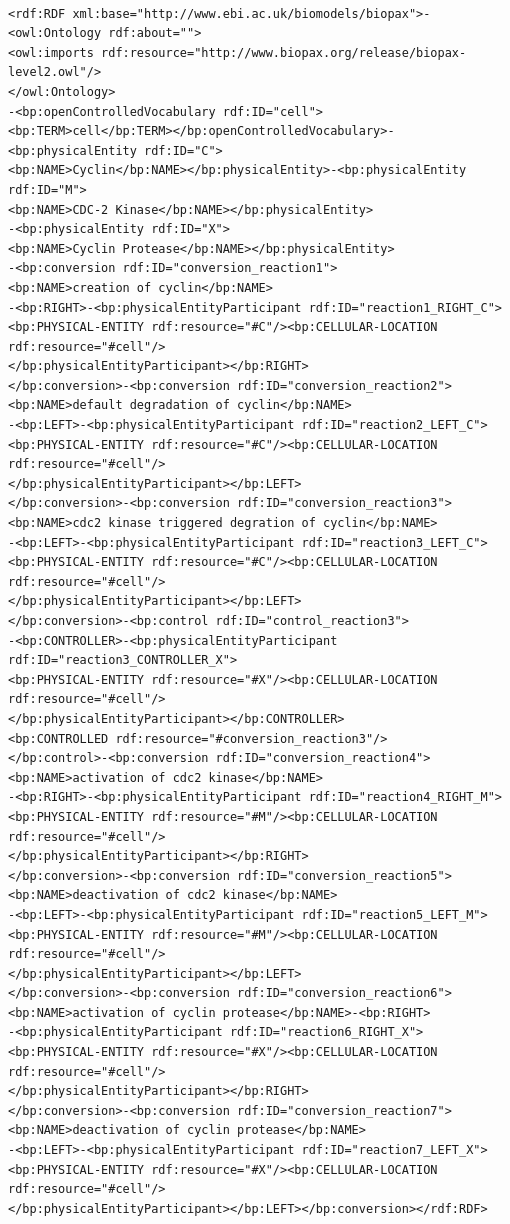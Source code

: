 \documentclass[a4paper,10pt,titlepage]{article}
\begin{document}
\scriptsize
\begin{verbatim}

<rdf:RDF xml:base="http://www.ebi.ac.uk/biomodels/biopax">-<owl:Ontology rdf:about="">
<owl:imports rdf:resource="http://www.biopax.org/release/biopax-level2.owl"/>
</owl:Ontology>
-<bp:openControlledVocabulary rdf:ID="cell">
<bp:TERM>cell</bp:TERM></bp:openControlledVocabulary>-<bp:physicalEntity rdf:ID="C">
<bp:NAME>Cyclin</bp:NAME></bp:physicalEntity>-<bp:physicalEntity rdf:ID="M">
<bp:NAME>CDC-2 Kinase</bp:NAME></bp:physicalEntity>
-<bp:physicalEntity rdf:ID="X">
<bp:NAME>Cyclin Protease</bp:NAME></bp:physicalEntity>
-<bp:conversion rdf:ID="conversion_reaction1">
<bp:NAME>creation of cyclin</bp:NAME>
-<bp:RIGHT>-<bp:physicalEntityParticipant rdf:ID="reaction1_RIGHT_C">
<bp:PHYSICAL-ENTITY rdf:resource="#C"/><bp:CELLULAR-LOCATION rdf:resource="#cell"/>
</bp:physicalEntityParticipant></bp:RIGHT>
</bp:conversion>-<bp:conversion rdf:ID="conversion_reaction2">
<bp:NAME>default degradation of cyclin</bp:NAME>
-<bp:LEFT>-<bp:physicalEntityParticipant rdf:ID="reaction2_LEFT_C">
<bp:PHYSICAL-ENTITY rdf:resource="#C"/><bp:CELLULAR-LOCATION rdf:resource="#cell"/>
</bp:physicalEntityParticipant></bp:LEFT>
</bp:conversion>-<bp:conversion rdf:ID="conversion_reaction3">
<bp:NAME>cdc2 kinase triggered degration of cyclin</bp:NAME>
-<bp:LEFT>-<bp:physicalEntityParticipant rdf:ID="reaction3_LEFT_C">
<bp:PHYSICAL-ENTITY rdf:resource="#C"/><bp:CELLULAR-LOCATION rdf:resource="#cell"/>
</bp:physicalEntityParticipant></bp:LEFT>
</bp:conversion>-<bp:control rdf:ID="control_reaction3">
-<bp:CONTROLLER>-<bp:physicalEntityParticipant rdf:ID="reaction3_CONTROLLER_X">
<bp:PHYSICAL-ENTITY rdf:resource="#X"/><bp:CELLULAR-LOCATION rdf:resource="#cell"/>
</bp:physicalEntityParticipant></bp:CONTROLLER>
<bp:CONTROLLED rdf:resource="#conversion_reaction3"/>
</bp:control>-<bp:conversion rdf:ID="conversion_reaction4">
<bp:NAME>activation of cdc2 kinase</bp:NAME>
-<bp:RIGHT>-<bp:physicalEntityParticipant rdf:ID="reaction4_RIGHT_M">
<bp:PHYSICAL-ENTITY rdf:resource="#M"/><bp:CELLULAR-LOCATION rdf:resource="#cell"/>
</bp:physicalEntityParticipant></bp:RIGHT>
</bp:conversion>-<bp:conversion rdf:ID="conversion_reaction5">
<bp:NAME>deactivation of cdc2 kinase</bp:NAME>
-<bp:LEFT>-<bp:physicalEntityParticipant rdf:ID="reaction5_LEFT_M">
<bp:PHYSICAL-ENTITY rdf:resource="#M"/><bp:CELLULAR-LOCATION rdf:resource="#cell"/>
</bp:physicalEntityParticipant></bp:LEFT>
</bp:conversion>-<bp:conversion rdf:ID="conversion_reaction6">
<bp:NAME>activation of cyclin protease</bp:NAME>-<bp:RIGHT>
-<bp:physicalEntityParticipant rdf:ID="reaction6_RIGHT_X">
<bp:PHYSICAL-ENTITY rdf:resource="#X"/><bp:CELLULAR-LOCATION rdf:resource="#cell"/>
</bp:physicalEntityParticipant></bp:RIGHT>
</bp:conversion>-<bp:conversion rdf:ID="conversion_reaction7">
<bp:NAME>deactivation of cyclin protease</bp:NAME>
-<bp:LEFT>-<bp:physicalEntityParticipant rdf:ID="reaction7_LEFT_X">
<bp:PHYSICAL-ENTITY rdf:resource="#X"/><bp:CELLULAR-LOCATION rdf:resource="#cell"/>
</bp:physicalEntityParticipant></bp:LEFT></bp:conversion></rdf:RDF>

\end{verbatim}
\end{document}
